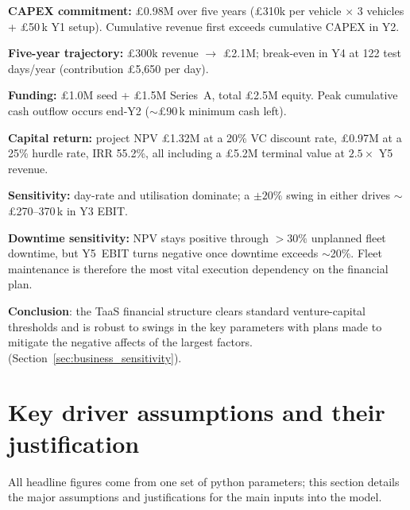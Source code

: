 \documentclass[11pt, a4paper]{report}
\numberwithin{equation}{section}
\newcommand{\yOneRevenue}{\pounds300k\xspace}
\newcommand{\yFiveRevenue}{\pounds2.1M\xspace}
\newcommand{\breakEvenYear}{Y4\xspace}
\newcommand{\breakEvenDays}{122\xspace}
\newcommand{\contributionMargin}{\pounds5,650\xspace}
\newcommand{\seedRound}{\pounds1.0M\xspace}
\newcommand{\seriesARound}{\pounds1.5M\xspace}
\newcommand{\totalRaise}{\pounds2.5M\xspace}
\newcommand{\capexPerVehicle}{\pounds310k\xspace}
\newcommand{\totalCapex}{\pounds0.98M\xspace}
\newcommand{\npvBase}{\pounds1.32M\xspace}
\newcommand{\npvHurdle}{\pounds0.97M\xspace}
\newcommand{\irr}{55.2\%\xspace}
\newcommand{\terminalValue}{\pounds5.2M\xspace}
\newcommand{\downtimeBreak}{$>30\%$\xspace}
\newcommand{\inversionCrossover}{Y2\xspace}
\begin{document}
\begin{refsection}
\begin{tightitemize}
  \item \textbf{CAPEX commitment:} \totalCapex over five years
        (\capexPerVehicle per vehicle $\times$ 3 vehicles +
        \pounds50\,k Y1 setup). Cumulative revenue first exceeds
        cumulative CAPEX in \inversionCrossover.
  \item \textbf{Five-year trajectory:} \yOneRevenue revenue $\to$
        \yFiveRevenue; break-even in \breakEvenYear at
        \breakEvenDays test days/year (contribution
        \contributionMargin per day).
  \item \textbf{Funding:} \seedRound seed + \seriesARound Series~A,
        total \totalRaise equity. Peak cumulative cash outflow
        occurs end-Y2 ($\sim$\pounds90\,k minimum cash left).
  \item \textbf{Capital return:} project NPV \npvBase at a 20\% VC
        discount rate, \npvHurdle at a 25\% hurdle rate, IRR \irr,
        all including a \terminalValue terminal value at $2.5\times$
        Y5 revenue.
  \item \textbf{Sensitivity:} day-rate and utilisation dominate; a
        $\pm 20\%$ swing in either drives $\sim$\pounds 270--370\,k
        in Y3 EBIT.
  \item \textbf{Downtime sensitivity:} NPV stays positive through
        \downtimeBreak unplanned fleet downtime, but Y5~EBIT turns
        negative once downtime exceeds $\sim$20\%. Fleet maintenance
        is therefore the most vital execution
        dependency on the financial plan.
\end{tightitemize}

\noindent \textbf{Conclusion}: the TaaS financial structure clears
standard venture-capital thresholds and is
robust to swings in the key parameters with plans made to mitigate the negative affects of the largest factors.
(Section~\ref{sec:business_sensitivity}).

\section{Key driver assumptions and their justification}
\label{ch:intro}
\label{sec:why_taas}
\label{sec:assumptions}

All headline figures come from one set of python parameters; this section details the major assumptions and justifications for the main inputs into the model.


\end{refsection}
\end{document}
